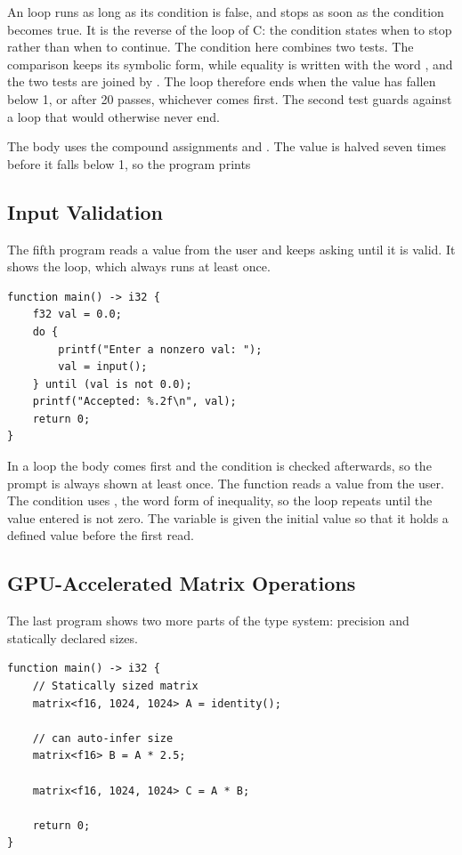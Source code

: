 An  loop runs as long as its condition is false, and stops as soon
as the condition becomes true. It is the reverse of the  loop of
C: the condition states when to stop rather than when to continue. The
condition here combines two tests. The comparison  keeps its
symbolic form, while equality is written with the word , and the two
tests are joined by . The loop therefore ends when the value has
fallen below 1, or after 20 passes, whichever comes first. The second test
guards against a loop that would otherwise never end.

The body uses the compound assignments \code{/=} and \code{+=}. The value is
halved seven times before it falls below 1, so the program prints

\subsection{Input Validation}

The fifth program reads a value from the user and keeps asking until it is
valid. It shows the  loop, which always runs at least once.

\begin{lstlisting}
function main() -> i32 {
    f32 val = 0.0;
    do {
        printf("Enter a nonzero val: ");
        val = input();
    } until (val is not 0.0);
    printf("Accepted: %.2f\n", val);
    return 0;
}
\end{lstlisting}

In a  loop the body comes first and the condition is checked
afterwards, so the prompt is always shown at least once. The function
 reads a value from the user. The condition uses ,
the word form of inequality, so the loop repeats until the value entered is not
zero. The variable is given the initial value  so that it holds a
defined value before the first read.

\subsection{GPU-Accelerated Matrix Operations}

The last program shows two more parts of the type system: precision and
statically declared sizes.

\begin{lstlisting}
function main() -> i32 {
    // Statically sized matrix
    matrix<f16, 1024, 1024> A = identity();

    // can auto-infer size
    matrix<f16> B = A * 2.5;

    matrix<f16, 1024, 1024> C = A * B;

    return 0;
}
\end{lstlisting}

